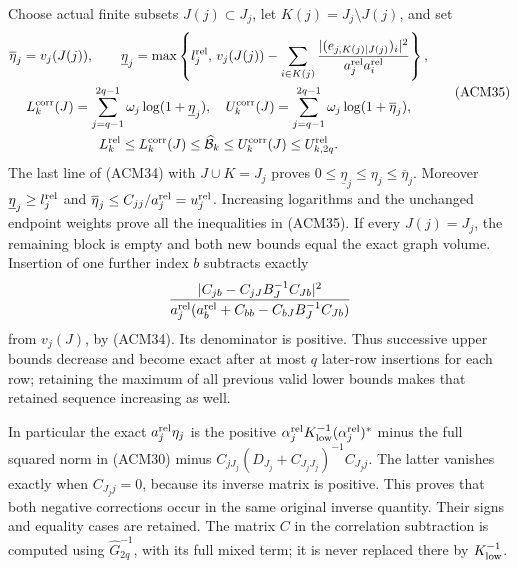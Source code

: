 Choose actual finite subsets $J(j)\subset J_j$, let
$K(j)=J_j\setminus J(j)$, and set
\[
\begin{gathered}
 \overline\eta_j=v_j(J(j)),\qquad
 \underline\eta_j=\max\left\{l_j^{\rm rel},\,
 v_j(J(j))-\sum_{i\in K(j)}
  \frac{|(e_{j,K(j)\mid J(j)})_i|^2}{a_j^{\rm rel}a_i^{\rm rel}}
                                                   \right\},\\
 L_k^{\rm corr}(J)=\sum_{j=q-1}^{2q-1}\omega_j\log(1+\underline\eta_j),
 \quad
 U_k^{\rm corr}(J)=\sum_{j=q-1}^{2q-1}\omega_j\log(1+\overline\eta_j),\\
 L_k^{\rm rel}\leq L_k^{\rm corr}(J)
 \leq\widehat{\mathcal B}_k\leq U_k^{\rm corr}(J)
 \leq U_{k,2q}^{\rm rel}.
\end{gathered}\tag{ACM35}
\]
The last line of (ACM34) with $J\cup K=J_j$ proves
$0\leq\underline\eta_j\leq\eta_j\leq\overline\eta_j$.
Moreover $\underline\eta_j\geq l_j^{\rm rel}$ and
$\overline\eta_j\leq C_{jj}/a_j^{\rm rel}=u_j^{\rm rel}$.
Increasing logarithms and the unchanged endpoint weights prove
all the inequalities in (ACM35). If every $J(j)=J_j$, the remaining
block is empty and both new bounds equal the exact graph volume.
Insertion of one further index $b$ subtracts exactly
\[
 \frac{|C_{jb}-C_{jJ}B_J^{-1}C_{Jb}|^2}
 {a_j^{\rm rel}(a_b^{\rm rel}+C_{bb}-C_{bJ}B_J^{-1}C_{Jb})}
\]
from $v_j(J)$, by (ACM34). Its denominator is positive. Thus
successive upper bounds decrease and become exact after at most
$q$ later-row insertions for each row; retaining the maximum
of all previous valid lower bounds makes that retained sequence
increasing as well.

In particular the exact $a_j^{\rm rel}\eta_j$ is the positive
$\alpha_j^{\rm rel}K_{\rm low}^{-1}(\alpha_j^{\rm rel})^*$
minus the full squared norm in (ACM30) minus
$C_{jJ_j}(D_{J_j}+C_{J_jJ_j})^{-1}C_{J_jj}$.
The latter vanishes exactly when $C_{J_jj}=0$, because its
inverse matrix is positive. This proves that both negative
corrections occur in the same original inverse quantity.
Their signs and equality cases are retained. The matrix $C$
in the correlation subtraction is computed using
$\widehat G_{2q}^{-1}$, with its full mixed term; it is never
replaced there by $K_{\rm low}^{-1}$.


